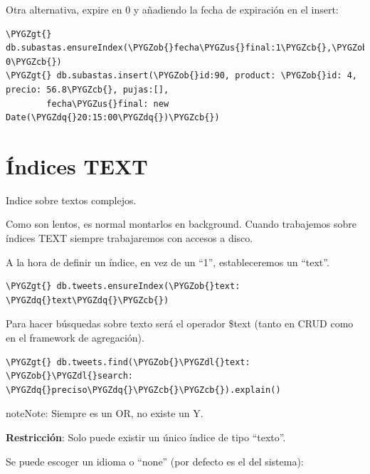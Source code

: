 \documentclass[a4paper,10pt,english]{sphinxmanual}
\def\PYGZus{\char`\_}
\def\PYGZob{\char`\{}
\def\PYGZcb{\char`\}}
\def\PYGZgt{\char`\>}
\def\PYGZdl{\char`\$}
\def\PYGZdq{\char`\"}
\begin{document}
Otra alternativa, expire en 0 y añadiendo la fecha de expiración en el insert:

\begin{Verbatim}[commandchars=\\\{\}]
\PYGZgt{} db.subastas.ensureIndex(\PYGZob{}fecha\PYGZus{}final:1\PYGZcb{},\PYGZob{}expireAfterSeconds: 0\PYGZcb{})
\PYGZgt{} db.subastas.insert(\PYGZob{}id:90, product: \PYGZob{}id: 4, precio: 56.8\PYGZcb{}, pujas:[],
        fecha\PYGZus{}final: new Date(\PYGZdq{}20:15:00\PYGZdq{})\PYGZcb{})
\end{Verbatim}


\section{Índices TEXT}
\label{contents/optimizing:indices-text}
Indice sobre textos complejos.

Como son lentos, es normal montarlos en background. Cuando trabajemos sobre índices TEXT siempre trabajaremos con accesos a disco.

A la hora de definir un índice, en vez de un ``1'', estableceremos un ``text''.

\begin{Verbatim}[commandchars=\\\{\}]
\PYGZgt{} db.tweets.ensureIndex(\PYGZob{}text: \PYGZdq{}text\PYGZdq{}\PYGZcb{})
\end{Verbatim}

Para hacer búsquedas sobre texto será el operador \$text (tanto en CRUD como en el framework de agregación).

\begin{Verbatim}[commandchars=\\\{\}]
\PYGZgt{} db.tweets.find(\PYGZob{}\PYGZdl{}text: \PYGZob{}\PYGZdl{}search: \PYGZdq{}preciso\PYGZdq{}\PYGZcb{}\PYGZcb{}).explain()
\end{Verbatim}

\begin{notice}{note}{Note:}
Siempre es un OR, no existe un Y.
\end{notice}

\textbf{Restricción}: Solo puede existir un único índice de tipo ``texto''.

Se puede escoger un idioma o ``none'' (por defecto es el del sistema):
\end{document}

